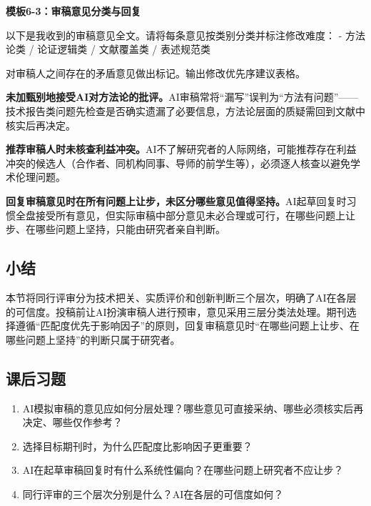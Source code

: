 \textbf{模板6-3：审稿意见分类与回复}

\begin{tcolorbox}[promptbox]
以下是我收到的审稿意见全文。请将每条意见按类别分类并标注修改难度：
- 方法论类 / 论证逻辑类 / 文献覆盖类 / 表述规范类

对审稿人之间存在的矛盾意见做出标记。输出修改优先序建议表格。
\end{tcolorbox}



\begin{mistakebox}

\textbf{未加甄别地接受AI对方法论的批评。}AI审稿常将``漏写''误判为``方法有问题''——技术报告类问题先检查是否确实遗漏了必要信息，方法论层面的质疑需回到文献中核实后再决定。

\smallskip

\textbf{推荐审稿人时未核查利益冲突。}AI不了解研究者的人际网络，可能推荐存在利益冲突的候选人（合作者、同机构同事、导师的前学生等），必须逐人核查以避免学术伦理问题。

\smallskip

\textbf{回复审稿意见时在所有问题上让步，未区分哪些意见值得坚持。}AI起草回复时习惯全盘接受所有意见，但实际审稿中部分意见未必合理或可行，在哪些问题上让步、在哪些问题上坚持，只能由研究者亲自判断。

\end{mistakebox}

\subsection*{小结}
本节将同行评审分为技术把关、实质评价和创新判断三个层次，明确了AI在各层的可信度。投稿前让AI扮演审稿人进行预审，意见采用三层分类法处理。期刊选择遵循``匹配度优先于影响因子''的原则，回复审稿意见时``在哪些问题上让步、在哪些问题上坚持''的判断只属于研究者。

\bigskip
\subsection*{课后习题}
\begin{enumerate}
\setlength{\itemsep}{6pt}

\item AI模拟审稿的意见应如何分层处理？哪些意见可直接采纳、哪些必须核实后再决定、哪些仅作参考？

\item 选择目标期刊时，为什么匹配度比影响因子更重要？

\item AI在起草审稿回复时有什么系统性偏向？在哪些问题上研究者不应让步？

\item 同行评审的三个层次分别是什么？AI在各层的可信度如何？

\end{enumerate}
\newpage

